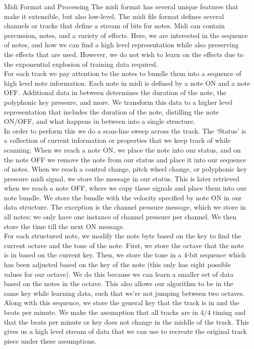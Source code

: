 \documentclass[11pt]{article}
\begin{document}
\begin{section}{Midi Format and Processing}
The midi format has several unique features that make it extensible, but also low-level. The midi file format defines several channels or tracks that define a stream of bits for notes. Midi can contain percussion, notes, and a variety of effects. Here, we are interested in the sequence of notes, and how we can find a high level representation while also preserving the effects that are used. However, we do not wish to learn on the effects due to the exponential explosion of training data required. \\

For each track we pay attention to the notes to bundle them into a sequence of high level note information. Each note in midi is defined by a note ON and a note OFF. Additional data in between determines the duration of the note, the polyphonic key pressure, and more. We transform this data to a higher level representation that includes the duration of the note, distilling the note ON/OFF, and what happens in between into a single structure. \\

In order to perform this we do a scan-line sweep across the track. The `Status' is a collection of current information or properties that we keep track of while scanning. When we reach a note ON, we place the note into our status, and on the note OFF we remove the note from our status and place it into our sequence of notes. When we reach a control change, pitch wheel change, or polyphonic key pressure midi signal, we store the message in our status. This is later retrieved when we reach a note OFF, where we copy these signals and place them into our note bundle. We store the bundle with the velocity specified by note ON in our data structure. The exception is the channel pressure message, which we store in all notes; we only have one instance of channel pressure per channel. We then store the time till the next ON message.\\

For each structured note, we modify the note byte based on the key to find the current octave and the tone of the note. First, we store the octave that the note is in based on the current key. Then, we store the tone in a $4$-bit sequence which has been adjusted based on the key of the note (this only has eight possible values for our octave). We do this because we can learn a smaller set of data based on the notes in the octave. This also allows our algorithm to be in the same key while learning data, such that we're not jumping between two octaves.\\

Along with this sequence, we store the general key that the track is in and the beats per minute. We make the assumption that all tracks are in $4/4$ timing and that the beats per minute or key does not change in the middle of the track. This gives us a high level stream of data that we can use to recreate the original track piece under these assumptions.
\end{section}
\end{document}
